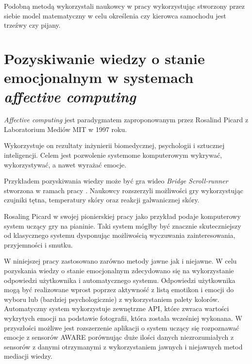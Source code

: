 Podobną metodą wykorzystali naukowcy w pracy \cite{dai2010mobile} wykorzystując stworzony przez siebie model matematyczny w celu określenia czy kierowca samochodu jest trzeźwy czy pijany.



\section{Pozyskiwanie wiedzy o stanie emocjonalnym w systemach \textit{affective computing}}
\label{sec:pozyskiwanieWiedzyOStanieEmocjonalnymWSystemachAffectiveComputing}

\textit{Affective computing} jest paradygmatem zaproponowanym przez Rosalind Picard z Laboratorium Mediów MIT w 1997 roku\cite{picard1997affective}.

Wykorzystuje on rezultaty inżynierii biomedycznej, psychologii i sztucznej inteligencji. Celem jest pozwolenie systemome komputerowym wykrywać, wykorzystywać, a nawet wyrażać emocje\cite{nalepa2017affective}.

Przykładem pozyskiwania wiedzy może być gra wideo \textit{Bridge Scroll-runner} stworzona w ramach pracy \cite{nalepa2017affective}. Naukowcy rozszerzyli możliwości gry wykorzystując czujniki tętna, temperatury skóry oraz reakcji galwanicznej skóry.

Rosaling Picard w swojej pionierskiej pracy \cite{picard1997affective} jako przykład podaje komputerowy system uczący gry na pianinie. Taki system mógłby być znacznie skuteczniejszy od klasycznego systemu dysponując możliwością wyczuwania zainteresowania, przyjemności i smutku.

W niniejszej pracy zastosowano zarówno metody jawne jak i niejawne. W celu pozyskania wiedzy o stanie emocjonalnym zdecydowano się na wykorzystanie odpowiedzi użytkownika i automatycznego systemu. Odpowiedzi użytkownika mogą być realizowane wprost poprzez aktywność z listą emotikon i emocji do wyboru lub (bardziej psychologicznie) z wykorzystaniem palety kolorów. Automatyczny system wykorzystuje zewnętrzne API, które zwraca wartości wykrytych emocji na podstawie fotografii, która została wcześniej wykonana. W przyszłości możliwe jest rozszerzenie aplikacji o system uczący się rozpoznawać emocje z sensorów AWARE porównując duże ilości danych niezrozumiałych z sensorów z danymi otrzymanymi z wykorzystaniem jawnych i niejawnych metod mediacji wiedzy.
